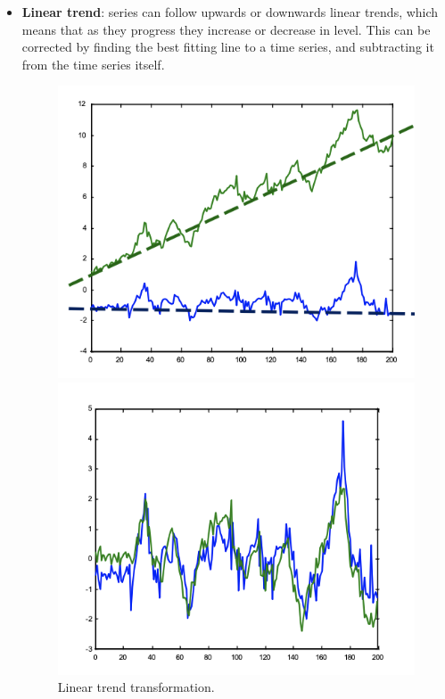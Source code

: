 \begin{itemize}
    \item \textbf{Linear trend}: series can follow upwards or downwards linear trends, which means that as they progress they increase or decrease in level. This can be corrected by finding the best fitting line to a time series, and subtracting it from the time series itself.
    \begin{figure}[h]
        \centering
        \begin{minipage}{0.40\textwidth}
            \includegraphics[width=1\linewidth]{img/lin_trend_1.png}
        \end{minipage}
        \hfill
        \begin{minipage}{0.40\textwidth}
            \includegraphics[width=1\linewidth]{img/lin_trend_2.png}
        \end{minipage}
        \caption{Linear trend transformation.}
        \label{fig:lin-trend}
    \end{figure}


\end{itemize}
